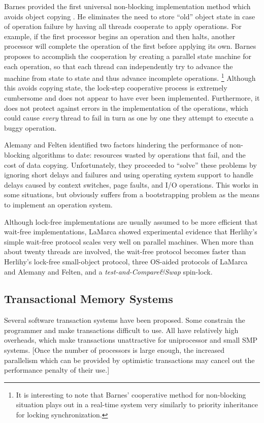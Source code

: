 \documentclass[12pt,oneside]{article}
\newcommand{\subsecput}[2]{\subsection{#2}\label{sec:#1}}
\begin{document}
Barnes provided the first universal non-blocking implementation
method which avoids object copying \cite{Barnes93}.  He eliminates the
need to store ``old'' object
state in case of operation failure by having all threads cooperate to
apply operations.  For example, if the first processor begins an operation
and then halts, another processor will complete the operation of the first
before applying its own.  Barnes proposes to accomplish the
cooperation by creating a parallel state machine for each operation,
so that each thread can independently try to advance the machine from state
to state and thus advance incomplete operations.%
\footnote{It is interesting to note that Barnes' cooperative method
  for non-blocking 
  situation plays out in a real-time system very similarly to priority
  inheritance for locking synchronization.}
Although this avoids
copying state, the lock-step cooperative process is extremely
cumbersome and does not appear to have ever been implemented.
Furthermore, it does not protect against errors in the implementation
of the operations, which could cause \emph{every} thread to fail in turn
as one by one they attempt to execute a buggy operation.

Alemany and Felten \cite{AlemanyFe92} identified two factors hindering the
performance of non-blocking algorithms to date: resources wasted by operations
that fail, and the cost of data copying.  Unfortunately, they
proceeded to
``solve'' these problems by ignoring short delays and failures and
using operating system support to handle delays caused by
context switches, page faults, and
I/O operations.  This works in some situations, but obviously suffers
from a bootstrapping problem as the means to implement an operation system.

Although lock-free implementations are usually assumed to be more
efficient that wait-free implementations, LaMarca \cite{LaMarca94}
showed experimental evidence that Herlihy's simple
wait-free protocol scales very well on parallel machines.
When more than about twenty threads are involved, the wait-free
protocol becomes
faster than Herlihy's lock-free small-object protocol, three OS-aided
protocols of LaMarca and Alemany and Felten, and a
\emph{test-and-Compare\&Swap} spin-lock.


\subsecput{tm}{Transactional Memory Systems}

Several software transaction systems have been proposed.  Some constrain the
programmer and make transactions difficult to use.  All have
relatively high overheads, which make transactions unattractive for
uniprocessor and small SMP systems. [Once the number of processors is
large enough, the increased parallelism which can be provided by
optimistic transactions may cancel out the performance penalty of
their use.]
\end{document}
